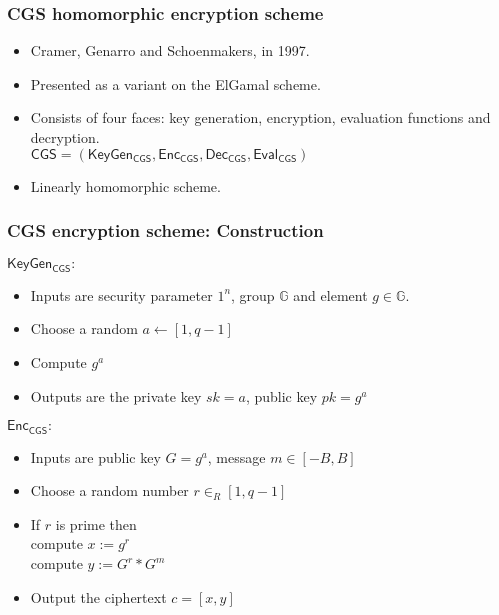 \documentclass{beamer}
\begin{document}
\begin{frame}[t]
\frametitle{CGS homomorphic encryption scheme}

\begin{itemize}
\item  Cramer, Genarro and Schoenmakers, in 1997.
\vspace*{3mm}
\item Presented as a variant on the ElGamal scheme.
\vspace*{3mm}   
\item   Consists of four faces: key generation, encryption, evaluation functions and decryption.\\ $\mathsf{CGS=(KeyGen_{CGS} , Enc_{CGS} , Dec_{CGS} , Eval_{CGS})}$
\vspace*{3mm}
\item Linearly homomorphic scheme.
\end{itemize}
\end{frame}

\begin{frame}[t]
\frametitle{ CGS encryption scheme: Construction}
\begin{block}{$\mathsf{KeyGen_{CGS}:}$}
\begin{itemize}
\item Inputs are security parameter $1^n$, group $\mathbb{G}$ and element $g \in \mathbb{G}$. 
\item Choose a random $a \longleftarrow [1,q-1]$
\item Compute $g^a$ 
\item Outputs are the private key $sk=a$, public key $pk=g^a$
\end{itemize} 
\end{block}
\begin{block}{$\mathsf{Enc_{CGS}:}$}
\begin{itemize}
\item Inputs are public key $G=g^a$, message $m\in [-B,B]$
\item Choose a random number $r\in_R [1,q-1]$   
\vspace*{2mm}
\item If {$r$ is prime} then\\
  compute  $x := g^r$\\
  compute $y := G^r*G^m$
  \vspace*{2mm}
\item Output the ciphertext $c=[x,y]$\\
\end{itemize} 
\end{block}
\end{frame}
\end{document}
